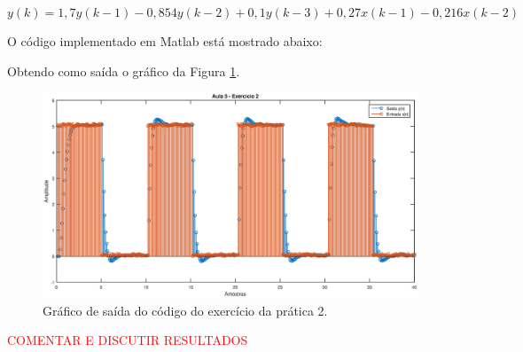 \begin{equation}
y(k) =  1,7y(k-1) - 0,854y(k-2) + 0,1y(k-3) + 0,27x(k-1) - 0,216x(k-2)
\end{equation}

O código implementado em Matlab está mostrado abaixo:


Obtendo como saída o gráfico da Figura \ref{saida_ex2_pr_2}.

\begin{landscape}
  \begin{figure}[!ht]
      \centering
      \includegraphics[scale = .66]{Imagens/Aula_5_exercicio2.eps}
      \caption{Gráfico de saída do código do exercício da prática 2.}
      \label{saida_ex2_pr_2}
  \end{figure}
\end{landscape}

\textcolor{red}{COMENTAR E DISCUTIR RESULTADOS}